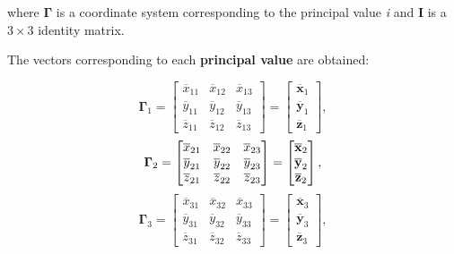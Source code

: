 \documentclass[10pt,b5paper,titlepage]{book}
\begin{document}
\begin{itemize}
        where $\mathbf{\Gamma}$ is a coordinate system corresponding to the
        principal value \textit{i} and $\mathbf{I}$ is a $3 \times 3$
        identity matrix.

        The vectors corresponding to each \textbf{principal value} are obtained:

        \begin{equation}
            \mathbf{\Gamma}_{1}
            = \begin{bmatrix}
                \overline{x}_{11} & \overline{x}_{12} & \overline{x}_{13}\\
                \overline{y}_{11} & \overline{y}_{12} & \overline{y}_{13}\\
                \overline{z}_{11} & \overline{z}_{12} & \overline{z}_{13}
            \end{bmatrix}
            = \begin{bmatrix}
                \overline{\mathbf{x}}_{1}\\
                \overline{\mathbf{y}}_{1}\\
                \overline{\mathbf{z}}_{1}
            \end{bmatrix}
        ,\end{equation}
        \begin{equation}
            \mathbf{\Gamma}_{2}
            = \begin{bmatrix}
                \overline{x}_{21} & \overline{x}_{22} & \overline{x}_{23}\\
                \overline{y}_{21} & \overline{y}_{22} & \overline{y}_{23}\\
                \overline{z}_{21} & \overline{z}_{22} & \overline{z}_{23}
            \end{bmatrix}
            = \begin{bmatrix}
                \overline{\mathbf{x}}_{2}\\
                \overline{\mathbf{y}}_{2}\\
                \overline{\mathbf{z}}_{2}
            \end{bmatrix} \\
        ,\end{equation}
        \begin{equation}
            \mathbf{\Gamma}_{3}
            = \begin{bmatrix}
                \overline{x}_{31} & \overline{x}_{32} & \overline{x}_{33}\\
                \overline{y}_{31} & \overline{y}_{32} & \overline{y}_{33}\\
                \overline{z}_{31} & \overline{z}_{32} & \overline{z}_{33}
            \end{bmatrix}
            = \begin{bmatrix}
                \overline{\mathbf{x}}_{3}\\
                \overline{\mathbf{y}}_{3}\\
                \overline{\mathbf{z}}_{3}
            \end{bmatrix}
        ,\end{equation}


\end{itemize}
\end{document}
